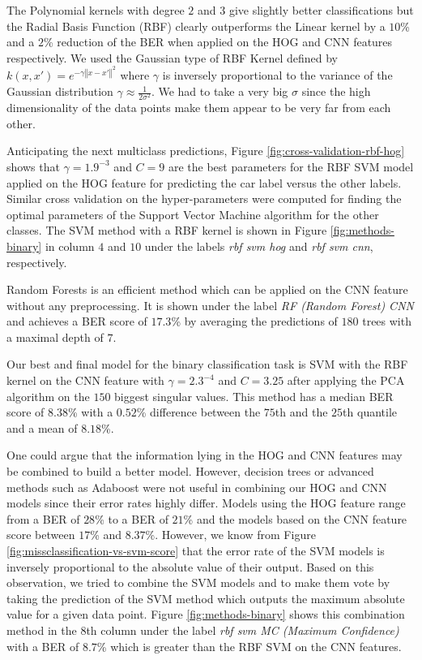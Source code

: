 \documentclass{article} %
\begin{document}
The Polynomial kernels with degree $2$ and $3$ give slightly better classifications but the Radial Basis Function (RBF) clearly outperforms the Linear kernel by a $10$\% and a $2$\% reduction of the BER when applied on  the HOG and CNN features respectively. We used the Gaussian type of RBF Kernel defined by $k\left(x,x'\right)=e^{-\gamma\left\Vert x-x'\right\Vert ^{2}}$ where $\gamma$ is inversely proportional to the variance of the Gaussian distribution $\gamma\approx$$\frac{1}{2\sigma^{2}}$. We had to take a very big $\sigma$ since the high dimensionality of the data points make them appear to be very far from each other.

Anticipating the next multiclass predictions, Figure \ref{fig:cross-validation-rbf-hog} shows that $\gamma=1.9^{-3}$ and $C=9$ are the best parameters for the RBF SVM model applied on the HOG feature for predicting the car label versus the other labels. Similar cross validation on the hyper-parameters were computed for finding the optimal parameters of the Support Vector Machine algorithm for the other classes. The SVM method with a RBF kernel is shown in Figure \ref{fig:methods-binary} in column $4$ and $10$ under the labels \textit{rbf svm hog} and \textit{rbf svm cnn}, respectively.

Random Forests is an efficient method which can be applied on the CNN feature without any preprocessing. It is shown under the label \textit{RF (Random Forest) CNN} and achieves a BER score of $17.3$\% by averaging the predictions of $180$ trees with a maximal depth of $7$.

Our best and final model for the binary classification task is SVM with the RBF kernel on the CNN feature with $\gamma=2.3^{-4}$ and $C=3.25$ after applying the PCA algorithm on the $150$ biggest singular values. This method has a median BER score of $8.38$\% with a $0.52$\% difference between the $75$th and the $25$th quantile and a mean of $8.18$\%.

One could argue that the information lying in the HOG and CNN features may be combined to build a better model. However, decision trees or advanced methods such as Adaboost were not useful in combining our HOG and CNN models since their error rates highly differ. Models using the HOG feature range from a BER of $28$\% to a BER of $21$\% and the models based on the CNN feature score between $17$\% and $8.37$\%. However, we know from Figure \ref{fig:missclassification-vs-svm-score} that the error rate of the SVM models is inversely proportional to the absolute value of their output. Based on this observation, we tried to combine the SVM models and to make them vote by taking the prediction of the SVM method which outputs the maximum absolute value for a given data point. Figure \ref{fig:methods-binary} shows  this combination method in the $8$th column under the label \textit{rbf svm MC (Maximum Confidence)} with a BER of $8.7$\% which is greater than the RBF SVM on the CNN features.
\end{document}
